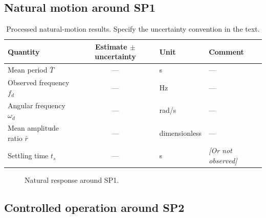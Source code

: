 \documentclass[11pt,a4paper]{article}
\newif\ifdraft
\DeclareRobustCommand{\guide}[1]{\ifdraft\par\smallskip\small\itshape Draft guidance: #1\par\smallskip\fi}
\newcommand{\manual}[1]{\cite[printed pp.~#1]{labmanual}}
\newcommand{\placeholder}[1]{\textit{[#1]}}
\newcommand{\figureplaceholder}[3]{%
  \begin{figure}[htbp]
    \centering
    \fbox{\parbox[c][38mm][c]{0.88\linewidth}{\centering
      \ifdraft #1\else Figure to be inserted\fi}}
    \caption{#2}\label{#3}
  \end{figure}}
\begin{document}
\subsection{Natural motion around SP1}
\guide{Report the observed motion, initial direction, cart motion, and final position. Present the periods, mean period, observed frequency $f_d$, angular frequency $\omega_d$, successive amplitude ratios and their mean, and settling time when visible. Compare positive and negative peaks as needed for the symmetry discussion. Sources: \manual{11--13}.}
\begin{table}[htbp]
\centering
\caption{Processed natural-motion results. Specify the uncertainty convention in the text.}
\label{tab:sp1results}
\begin{tabularx}{\linewidth}{@{}lclX@{}}
\toprule
Quantity & Estimate $\pm$ uncertainty & Unit & Comment \\
\midrule
Mean period $\bar T$ & --- & s & --- \\
Observed frequency $f_d$ & --- & Hz & --- \\
Angular frequency $\omega_d$ & --- & rad/s & --- \\
Mean amplitude ratio $\bar r$ & --- & dimensionless & --- \\
Settling time $t_s$ & --- & s & \placeholder{Or not observed} \\
\bottomrule
\end{tabularx}
\end{table}
\figureplaceholder{Insert angle versus time with identified peaks, uncertainty information, and the chosen SP1 reference.}{Natural response around SP1.}{fig:sp1}
\guide{Show one example of the period and amplitude-ratio calculations using actual data. Equations and same-direction peak requirement: \manual{11--13}. Frequency conversion formulas, if added, are supplemental standard theory and should be identified or cited accordingly.}

\subsection{Controlled operation around SP2}
\end{document}
